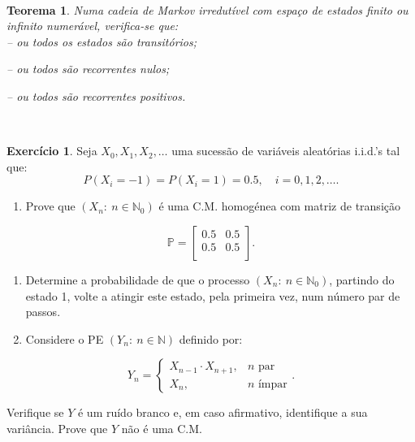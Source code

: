 \documentclass[
  11pt,
  a4paper,
]{book}
\providecommand{\tightlist}{%
  \setlength{\itemsep}{0pt}\setlength{\parskip}{0pt}}
\newtheorem{theorem}{Teorema}[chapter]
\theoremstyle{definition}
\theoremstyle{definition}
\theoremstyle{definition}
\newtheorem{exercise}{Exercício}[chapter]
\theoremstyle{definition}
\theoremstyle{remark}
\begin{document}
\(\,\)

\begin{theorem}
Numa cadeia de Markov irredutível com espaço de estados finito ou infinito numerável, verifica-se que:\\
-- ou todos os estados são transitórios;

-- ou todos são recorrentes nulos;

-- ou todos são recorrentes positivos.
\end{theorem}

\(\,\)

\begin{exercise}
Seja \(X_0, X_1, X_2, \dots\) uma sucessão de variáveis aleatórias i.i.d.'s tal que:
\[P(X_i=-1)=P(X_i=1)=0.5, \quad i=0,1,2,\dots.\]

\begin{enumerate}
\def\labelenumi{(\alph{enumi})}
\tightlist
\item
  Prove que \((X_n: ~n \in \mathbb{N}_0)\) é uma C.M. homogénea com matriz de transição
\end{enumerate}

\[\mathbb{P}=
\begin{bmatrix}
0.5 & 0.5  \\
0.5 & 0.5  \\
\end{bmatrix}.\]

\begin{enumerate}
\def\labelenumi{(\alph{enumi})}
\setcounter{enumi}{1}
\item
  Determine a probabilidade de que o processo \((X_n: ~n \in \mathbb{N}_0)\), partindo do estado 1, volte a atingir este estado, pela primeira vez, num número par de passos.
\item
  Considere o PE \((Y_n: ~n \in \mathbb{N})\) definido por:
\end{enumerate}

\[
Y_n=
\begin{cases}
X_{n-1} \cdot X_{n+1}, & n \text{ par}\\
X_{n}, & n \text{ ímpar}
\end{cases}.
\]

Verifique se \(Y\) é um ruído branco e, em caso afirmativo, identifique a sua variância. Prove que \(Y\) não é uma C.M.
\end{exercise}

\(\,\)
\end{document}

